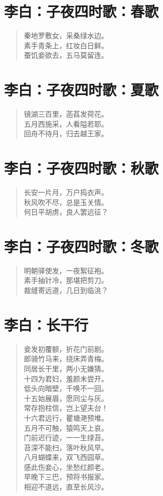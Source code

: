 \documentclass[12pt,oneside]{book}
\newenvironment{shici}{
\begin{verse}
\centering\large\hspace{12pt}}
{\end{verse}}
\begin{document}
\chapter{李白：子夜四时歌：春歌}
\begin{shici}
秦地罗敷女，采桑绿水边。\\
素手青条上，红妆白日鲜。\\
蚕饥妾欲去，五马莫留连。
\end{shici}

\chapter{李白：子夜四时歌：夏歌}
\begin{shici}
镜湖三百里，菡萏发荷花。\\
五月西施采，人看隘若耶。\\
回舟不待月，归去越王家。
\end{shici}

\chapter{李白：子夜四时歌：秋歌}
\begin{shici}
长安一片月，万户捣衣声。\\
秋风吹不尽，总是玉关情。\\
何日平胡虏，良人罢远征？
\end{shici}

\chapter{李白：子夜四时歌：冬歌}
\begin{shici}
明朝驿使发，一夜絮征袍。\\
素手抽针冷，那堪把剪刀。\\
裁缝寄远道，几日到临洮？
\end{shici}

\chapter{李白：长干行}
\begin{shici}
妾发初覆额，折花门前剧。\\
郎骑竹马来，绕床弄青梅。\\
同居长干里，两小无嫌猜。\\
十四为君妇，羞颜未尝开。\\
低头向暗壁，千唤不一回。\\
十五始展眉，愿同尘与灰。\\
常存抱柱信，岂上望夫台！\\
十六君远行，瞿塘滟预堆。\\
五月不可触，猿鸣天上哀。\\
门前迟行迹，一一生绿苔。\\
苔深不能扫，落叶秋风早。\\
八月蝴蝶来，双飞西园草。\\
感此伤妾心，坐愁红颜老。\\
早晚下三巴，预将书报家。\\
相迎不道远，直至长风沙。
\end{shici}
\end{document}
